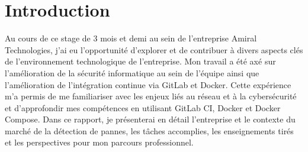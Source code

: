 \section{Introduction}
Au cours de ce stage de 3 mois et demi au sein de l'entreprise Amiral Technologies, j'ai eu l'opportunité d'explorer et de contribuer à divers aspects clés de l'environnement technologique de l'entreprise.
Mon travail a été axé sur l'amélioration de la sécurité informatique au sein de l'équipe ainsi que l'amélioration de l'intégration continue via GitLab et Docker.
Cette expérience m'a permis de me familiariser avec les enjeux liés au réseau et à la cybersécurité et d'approfondir mes compétences en utilisant GitLab CI, Docker et Docker Compose.
Dans ce rapport, je présenterai en détail l'entreprise et le contexte du marché de la détection de pannes, les tâches accomplies, les enseignements tirés et les perspectives pour mon parcours professionnel.
